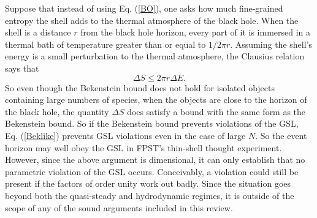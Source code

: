 \documentclass{article}
\begin{document}
Suppose that instead of using Eq. (\ref{BO}), one asks how much fine-grained entropy the shell adds to the thermal atmosphere of the black hole.  When the shell is a distance $r$ from the black hole horizon, every part of it is immersed in a thermal bath of temperature greater than or equal to $1/{2\pi r}$.  Assuming the shell's energy is a small perturbation to the thermal atmosphere, the Clausius relation says that
\begin{equation}\label{Beklike}
\Delta S \le 2\pi r\Delta E.
\end{equation}
So even though the Bekenstein bound does not hold for isolated objects containing large numbers of species, when the objects are close to the horizon of the black hole, the quantity $\Delta S$ does satisfy a bound with the same form as the Bekenstein bound.  So if the Bekenstein bound prevents violations of the GSL, Eq. (\ref{Beklike}) prevents GSL violations even in the case of large $N$.  So the event horizon may well obey the GSL in FPST's thin-shell thought experiment.  However, since the above argument is dimensional, it can only establish that no parametric violation of the GSL occurs.  Conceivably, a violation could still be present if the factors of order unity work out badly.  Since the situation goes beyond both the quasi-steady and hydrodynamic regimes, it is outside of the scope of any of the sound arguments included in this review.
\end{document}

